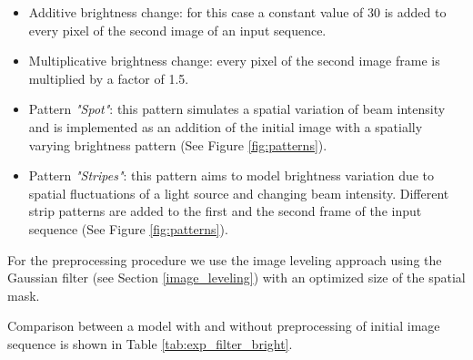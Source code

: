\begin{itemize}

\item Additive brightness change: for this case a constant value of 30 is added to every pixel of the second image of an input sequence.

\item Multiplicative brightness change: every pixel of the second image frame is multiplied by a factor of 1.5. 

\item Pattern \textit{"Spot"}: this pattern simulates a spatial variation of beam intensity and is implemented as an addition of the initial image with a spatially varying brightness pattern (See Figure \ref{fig:patterns}).

\item Pattern \textit{"Stripes"}: this pattern aims to model brightness variation due to spatial fluctuations of a light source and changing beam intensity. Different strip patterns are added to the first and the second frame of the input sequence (See Figure \ref{fig:patterns}).
\end{itemize}
For the preprocessing procedure we use the image leveling approach using the Gaussian filter (see Section \ref{image_leveling}) with an optimized size of the spatial mask. 

Comparison between a model with and without preprocessing of initial image sequence is shown in Table \ref{tab:exp_filter_bright}.


